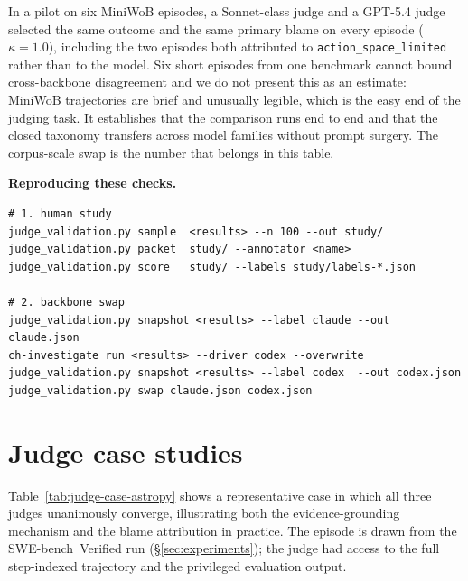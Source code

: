 \documentclass{article}
\newcommand{\mypar}[1]{\par\noindent\textbf{#1}\enspace}
\begin{document}
In a pilot on six MiniWoB episodes, a Sonnet-class judge and a GPT-5.4 judge
selected the same outcome and the same primary blame on every episode
($\kappa{=}1.0$), including the two episodes both attributed to
\texttt{action\_space\_limited} rather than to the model. Six short episodes
from one benchmark cannot bound cross-backbone disagreement and we do not
present this as an estimate: MiniWoB trajectories are brief and unusually
legible, which is the easy end of the judging task. It establishes that the
comparison runs end to end and that the closed taxonomy transfers across model
families without prompt surgery. The corpus-scale swap is the number that
belongs in this table.

\mypar{Reproducing these checks.}
\begin{verbatim}
# 1. human study
judge_validation.py sample  <results> --n 100 --out study/
judge_validation.py packet  study/ --annotator <name>
judge_validation.py score   study/ --labels study/labels-*.json

# 2. backbone swap
judge_validation.py snapshot <results> --label claude --out claude.json
ch-investigate run <results> --driver codex --overwrite
judge_validation.py snapshot <results> --label codex  --out codex.json
judge_validation.py swap claude.json codex.json
\end{verbatim}


\section{Judge case studies}
\label{apdx:judge-cases}

Table~\ref{tab:judge-case-astropy} shows a representative case in which all
three judges unanimously converge, illustrating both the evidence-grounding
mechanism and the blame attribution in practice.  The episode is drawn from
the SWE-bench~Verified run (\S\ref{sec:experiments}); the judge had access to
the full step-indexed trajectory and the privileged evaluation output.
\end{document}
